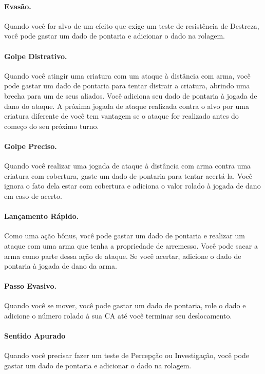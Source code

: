 \documentclass{RPG_Adventure}[2021/10/20]
\begin{document}
\begin{multicols}{2}
\paragraph{Evasão.}%

Quando você for alvo de um efeito que exige um teste de resistência de Destreza,
você pode gastar um dado de pontaria e adicionar o dado na rolagem.

\paragraph{Golpe Distrativo.}%

Quando você atingir uma criatura com um ataque à distância com arma, você pode
gastar um dado de pontaria para tentar distrair a criatura, abrindo uma brecha
para um de seus aliados. Você adiciona seu dado de pontaria à jogada de dano do
ataque. A próxima jogada de ataque realizada contra o alvo por uma criatura
diferente de você tem vantagem se o ataque for realizado antes do começo do seu
próximo turno.

\paragraph{Golpe Preciso.}%

Quando você realizar uma jogada de ataque à distância com arma contra uma
criatura com cobertura, gaste um dado de pontaria para tentar acertá-la. Você
ignora o fato dela estar com cobertura e adiciona o valor rolado à jogada de
dano em caso de acerto.

\paragraph{Lançamento Rápido.}%

Como uma ação bônus, você pode gastar um dado de pontaria e realizar um ataque
com uma arma que tenha a propriedade de arremesso. Você pode sacar a arma como
parte dessa ação de ataque. Se você acertar, adicione o dado de pontaria à
jogada de dano da arma.

\paragraph{Passo Evasivo.}%

Quando você se mover, você pode gastar um dado de pontaria, role o dado e
adicione o número rolado à sua CA até você terminar seu deslocamento.

\paragraph{Sentido Apurado}%

Quando você precisar fazer um teste de Percepção ou Investigação, você pode
gastar um dado de pontaria e adicionar o dado na rolagem.

\end{multicols}
\end{document}

